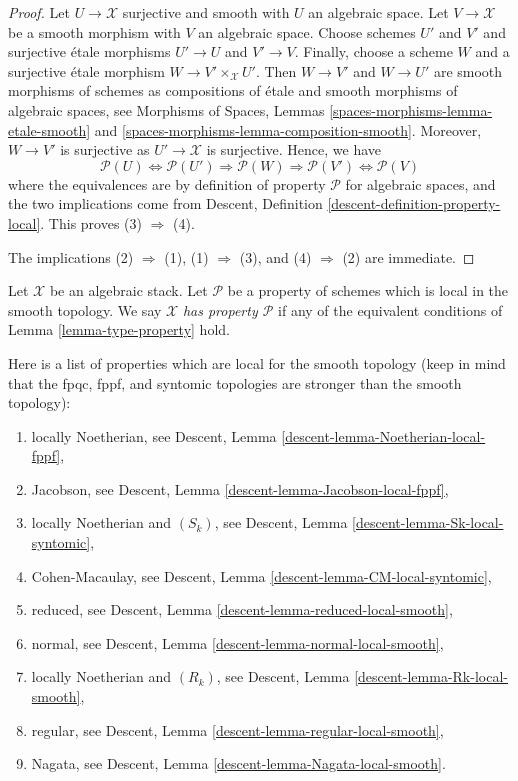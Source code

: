 \begin{proof}
Let $U \to \mathcal{X}$ surjective and smooth with $U$ an algebraic space.
Let $V \to \mathcal{X}$ be a smooth morphism with $V$ an algebraic space.
Choose schemes $U'$ and $V'$ and surjective \'etale morphisms
$U' \to U$ and $V' \to V$. Finally, choose a scheme $W$ and a
surjective \'etale morphism $W \to V' \times_\mathcal{X} U'$.
Then $W \to V'$ and $W \to U'$ are smooth morphisms of schemes
as compositions of \'etale and smooth morphisms of algebraic spaces, see
Morphisms of Spaces, Lemmas \ref{spaces-morphisms-lemma-etale-smooth} and
\ref{spaces-morphisms-lemma-composition-smooth}.
Moreover, $W \to V'$ is surjective as $U' \to \mathcal{X}$ is surjective.
Hence, we have
$$
\mathcal{P}(U) \Leftrightarrow
\mathcal{P}(U') \Rightarrow
\mathcal{P}(W) \Rightarrow
\mathcal{P}(V') \Leftrightarrow \mathcal{P}(V)
$$
where the equivalences are by definition of property $\mathcal{P}$ for
algebraic spaces, and the two implications come from
Descent, Definition \ref{descent-definition-property-local}.
This proves (3) $\Rightarrow$ (4).

\medskip\noindent
The implications (2) $\Rightarrow$ (1), (1) $\Rightarrow$ (3),
and (4) $\Rightarrow$ (2) are immediate.
\end{proof}

\begin{definition}
\label{definition-type-property}
Let $\mathcal{X}$ be an algebraic stack.
Let $\mathcal{P}$ be a property of schemes which is
local in the smooth topology.
We say $\mathcal{X}$ {\it has property $\mathcal{P}$}
if any of the equivalent conditions of
Lemma \ref{lemma-type-property}
hold.
\end{definition}

\begin{remark}
\label{remark-list-properties-local-smooth-topology}
Here is a list of properties which are local for the smooth topology
(keep in mind that the fpqc, fppf, and syntomic topologies are
stronger than the smooth topology):
\begin{enumerate}
\item locally Noetherian, see
Descent, Lemma \ref{descent-lemma-Noetherian-local-fppf},
\item Jacobson, see
Descent, Lemma \ref{descent-lemma-Jacobson-local-fppf},
\item locally Noetherian and $(S_k)$, see
Descent, Lemma \ref{descent-lemma-Sk-local-syntomic},
\item Cohen-Macaulay, see
Descent, Lemma \ref{descent-lemma-CM-local-syntomic},
\item reduced, see
Descent, Lemma \ref{descent-lemma-reduced-local-smooth},
\item normal, see
Descent, Lemma \ref{descent-lemma-normal-local-smooth},
\item locally Noetherian and $(R_k)$, see
Descent, Lemma \ref{descent-lemma-Rk-local-smooth},
\item regular, see
Descent, Lemma \ref{descent-lemma-regular-local-smooth},
\item Nagata, see
Descent, Lemma \ref{descent-lemma-Nagata-local-smooth}.
\end{enumerate}
\end{remark}

